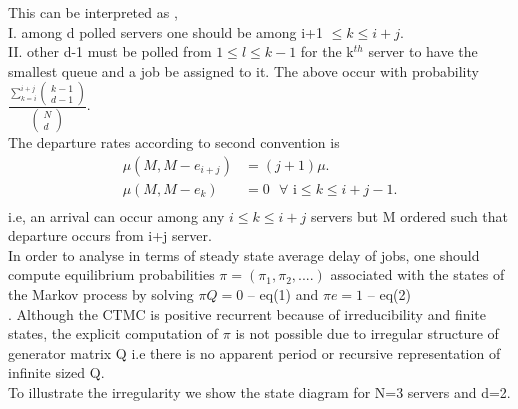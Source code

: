 \documentclass[a4paper,english,12pt]{article}
\begin{document}
\begin{itemize}
This can be interpreted as ,\\ 
I. among d polled servers one should be among i+1 $\le k \le i+j$.\\
II. other d-1 must be polled from $1 \le l \le k-1$ for the k$^{th}$ server to have the smallest queue and a job be assigned to it. The above occur with probability $\frac{\sum\limits_{k=i}^{i+j}\begin{pmatrix} k-1 \\ d-1 \end{pmatrix}}{\begin{pmatrix} N \\ d \end{pmatrix}}$.\\
The departure rates according to second convention is \\
\begin{align*} 
\mu(M,M-e_{i+j}) &= (j+1)\mu.\\
\mu(M,M-e_k) &= 0 \text{   		 }   \forall \text{ 		  i} \le k \le i+j-1.  \\
\end{align*}
i.e, an arrival can occur among any $ i \le k \le i+j$ servers but M ordered such that departure occurs from i+j server.\\
In order to analyse in terms of steady state average delay of jobs, one should compute equilibrium probabilities $ \pi =(\pi_1,\pi_2,....) $ associated with the states of the Markov process by solving $\pi Q = 0 $ --  eq(1)  and $\pi e =1$ --   eq(2)\\.
Although the CTMC is positive recurrent because of irreducibility and finite states, the explicit computation of $\pi$ is not possible due to irregular structure of generator matrix Q i.e there is no apparent period or recursive representation of infinite sized Q.\\
To illustrate the irregularity we show the state diagram for N=3 servers and d=2. \\
\end{itemize}
\end{document}
